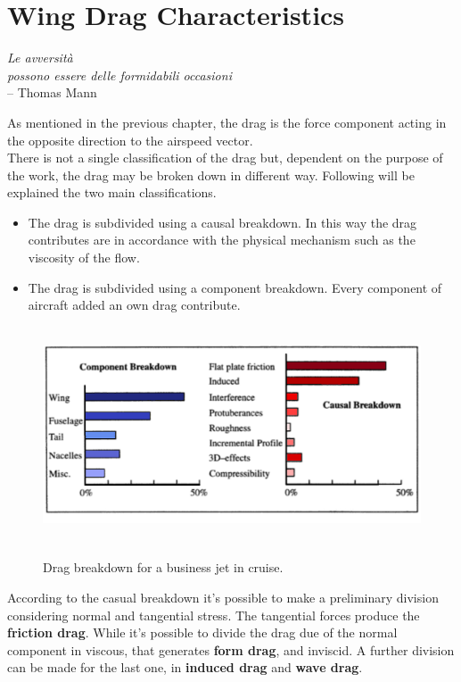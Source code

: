 \chapter{Wing Drag Characteristics}

\label{ch:wingdrag}

\begin{flushright}
	{\smaller
		\textit{Le avversità\\ possono essere delle formidabili occasioni}\\
		-- Thomas Mann}
\end{flushright}


As mentioned in the previous chapter, the drag is the force component acting in the opposite direction to the airspeed vector.\\
There is not a single classification of the drag but, dependent on the purpose of the work, the drag may be broken down in different way. Following will be explained the two main classifications.

\begin{itemize}
\item The drag is subdivided using a causal breakdown. In this way the drag contributes are in accordance with the physical mechanism such as the viscosity of the flow.
\item The drag is subdivided using a component breakdown. Every component of aircraft added an own drag contribute.
\end{itemize}

\begin{figure}[H]
\centering
{\includegraphics[height=6.4cm]{Immagini/component.png}} 
\caption{Drag breakdown for a business jet in cruise.}
\end{figure}

According to the casual breakdown it's possible to make a preliminary division considering normal and tangential stress. The tangential forces produce the {\bfseries friction drag}. While it's possible to divide the drag due of the normal component in viscous, that generates {\bfseries form drag}, and inviscid. A further division can be made for the last one, in {\bfseries induced drag}  and {\bfseries wave drag}.\\

